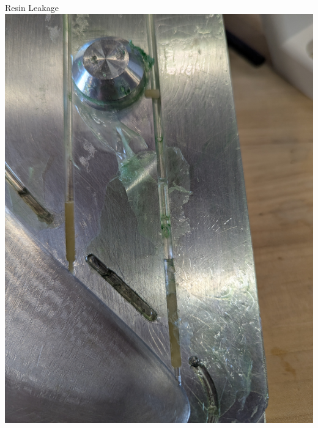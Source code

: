\begin{frame}{Resin Leakage}
    \includegraphics[height=0.5\textheight,keepaspectratio]{images/sf_mold_tipAirTube_flooded.jpg}

\end{frame}

